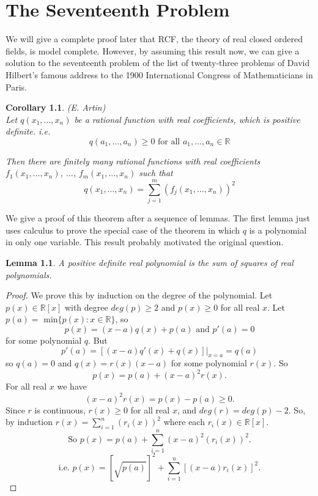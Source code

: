 \documentclass[titlepage, oneside]{amsbook}
\theoremstyle{plain}
\newtheorem{lemma}{Lemma}
\newtheorem{corollary}{Corollary}
\theoremstyle{definition}
\theoremstyle{remark}
\newcommand{\anot}[2][0]{\ensuremath{ a_{#1} , \dots , a_{#2}}}
\newcommand{\xnot}[2][0]{\ensuremath{ x_{#1} , \dots , x_{#2}}}
\begin{document}
\chapter{The Seventeenth Problem}

We will give a complete proof later that RCF, the theory of real closed
ordered fields, is model complete.  However, by assuming this result
now, we can give a solution to the seventeenth problem of the list of
twenty-three problems of  David Hilbert's famous address to the 1900
International Congress of Mathematicians in Paris.



\begin{corollary}\label{C:Artin} (E. Artin)\\
Let $q ( \xnot[1]{n} )$ be a rational function with real coefficients, 
which is positive definite. i.e. \[ q( \anot[1]{n}) \geq 0 \mbox{ for
all } 
\anot[1]{n} \in \mathbb{R} \]

Then there are finitely many rational functions with real coefficients \\
$f_1(\xnot[1]{n} )$, $\dots$, $f_m ( \xnot[1]{n})$ such that \[
q(x_1, 
\dots , x_n ) = \sum_{j=1}^{m} (f_j ( \xnot[1]{n}))^2 \]
\end{corollary}

We give a proof of this theorem after a sequence of lemmas.  The first
lemma just uses calculus to prove the special case of the theorem in which
$q$ is a polynomial in only one variable.  This result probably motivated
the original question.

\begin{lemma}    A positive definite real polynomial is the sum of
squares of real polynomials.
\end{lemma}

\begin{proof} We prove this by induction on the degree of the
polynomial. Let $p(x) \in \mathbb R [x]$ with degree $deg(p)
\geq 2$ and $p(x) \geq 0 $ for all real $x$. Let $p(a) =
\mbox{ min} \{ p(x) : x \in \mathbb R \}$, so \[p(x) = (x -a) q(x) + p(a)
\mbox{ and  } p'(a) =0 \] for some polynomial $q$. But
\[  p'(a) =[(x-a)q'(x) +q(x)] \bigr|_{x=a} =q(a) \]
so $q(a) =0$ and $q(x) = r(x) (x-a)$ for some polynomial $r(x)$. So
\[  p(x) = p(a) + (x-a)^2 r(x) .\]  For all real $x$ we have 
\[ (x -a)^2 r(x) = p(x) - p(a) \geq 0. \]
Since $r$ is continuous, $r(x) \geq 0$ for all real $x$, and 
$deg(r) = deg(p) -2 $.
So, by induction $ r(x) = \sum_{i=1}^{n} \left( r_i (x) \right)^2$
where each $r_i (x) \in \mathbb R [x]$.
\[\mbox{So } p(x) = p(a) + \sum_{i=1}^{n} (x-a)^2 \left( r_i (x)
\right)^2. \]
\[\mbox{i.e. } p(x) =  \left[ \sqrt{ p(a) } \right]^2 + \sum_{i=1}^{n}
\left[ (x-a)r_i(x) \right]^2 .\]

\end{proof}
\end{document}
